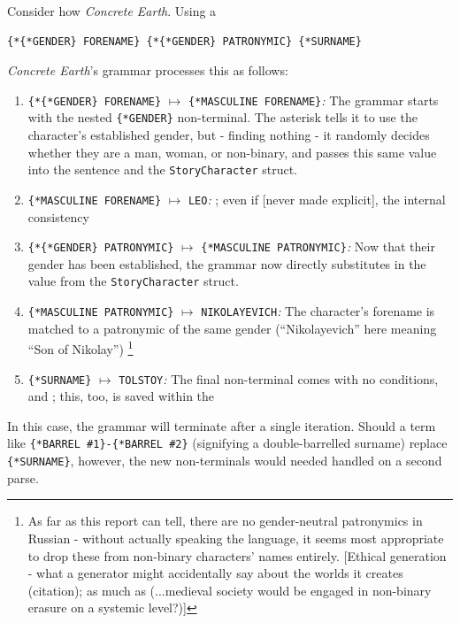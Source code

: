 \documentclass[a4paper, 11pt]{article}
\begin{document}
\begin{flushleft}
\vspace{5pt}\noindent
Consider how \textit{Concrete Earth}. Using a 
\begin{center}
\begin{BVerbatim}
{*{*GENDER} FORENAME} {*{*GENDER} PATRONYMIC} {*SURNAME}
\end{BVerbatim}
\end{center}
\textit{Concrete Earth}'s grammar processes this as follows:
\begin{enumerate}[label=\textit{\arabic*}\textit{.}, noitemsep]
\item \verb|{*{*GENDER} FORENAME}| $\mapsto$ \verb|{*MASCULINE FORENAME}|\textit{:} The grammar starts with the nested \verb|{*GENDER}| non-terminal. The asterisk tells it to use the character's established gender, but - finding nothing - it randomly decides whether they are a man, woman, or non-binary, and passes this same value into the sentence and the \texttt{StoryCharacter} struct.
\item \verb|{*MASCULINE FORENAME}| $\mapsto$ \verb|LEO|\textit{:} ; even if [never made explicit], the internal consistency
\item \verb|{*{*GENDER} PATRONYMIC}| $\mapsto$ \verb|{*MASCULINE PATRONYMIC}|\textit{:} Now that their gender has been established, the grammar now directly substitutes in the value from the \texttt{StoryCharacter} struct.
\item \verb|{*MASCULINE PATRONYMIC}| $\mapsto$ \verb|NIKOLAYEVICH|\textit{:} The character's forename is matched to a patronymic of the same gender (``Nikolayevich'' here meaning ``Son of Nikolay'') \footnote{As far as this report can tell, there are no gender-neutral patronymics in Russian - without actually speaking the language, it seems most appropriate to drop these from non-binary characters' names entirely. [Ethical generation - what a generator might accidentally say about the worlds it creates (citation); as much as (...medieval society would be engaged in non-binary erasure on a systemic level?)]}
\item \verb|{*SURNAME}| $\mapsto$ \verb|TOLSTOY|\textit{:} The final non-terminal comes with no conditions, and ; this, too, is saved within the
\end{enumerate}
In this case, the grammar will terminate after a single iteration. Should a term like \verb|{*BARREL #1}-{*BARREL #2}| (signifying a double-barrelled surname) replace \verb|{*SURNAME}|, however, the new non-terminals would needed handled on a second parse.


\end{flushleft}
\end{document}
